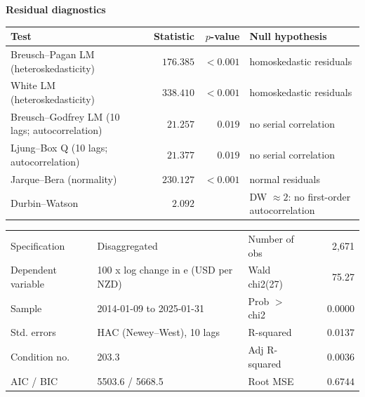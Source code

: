 \documentclass[10pt]{article}
\begin{document}
\noindent\textbf{Residual diagnostics}\\[0.3em]
\begin{tabular}{@{}l|rr l@{}}
\hline
Test & Statistic & $p$-value & Null hypothesis \\
\hline
Breusch--Pagan LM (heteroskedasticity) & $\phantom{-}176.385$ & $<\!0.001$ & homoskedastic residuals \\
White LM (heteroskedasticity) & $\phantom{-}338.410$ & $<\!0.001$ & homoskedastic residuals \\
Breusch--Godfrey LM (10 lags; autocorrelation) & $\phantom{-}21.257$ & $0.019$ & no serial correlation \\
Ljung--Box Q (10 lags; autocorrelation) & $\phantom{-}21.377$ & $0.019$ & no serial correlation \\
Jarque--Bera (normality) & $\phantom{-}230.127$ & $<\!0.001$ & normal residuals \\
Durbin--Watson & $\phantom{-}2.092$ &  & DW $\approx 2$: no first-order autocorrelation \\
\hline
\end{tabular}
\newpage
\noindent\begin{tabular}{@{}l l @{\hspace{3em}} l r@{}}
Specification & Disaggregated & Number of obs & 2,671 \\
Dependent variable & 100 x log change in e (USD per NZD) & Wald chi2(27) & 75.27 \\
Sample & 2014-01-09 to 2025-01-31 & Prob $>$ chi2 & 0.0000 \\
Std. errors & HAC (Newey--West), 10 lags & R-squared & 0.0137 \\
Condition no. & 203.3 & Adj R-squared & 0.0036 \\
AIC / BIC & 5503.6 / 5668.5 & Root MSE & $\phantom{-}0.6744$ \\
\end{tabular}
\vspace{0.8em}
\end{document}
